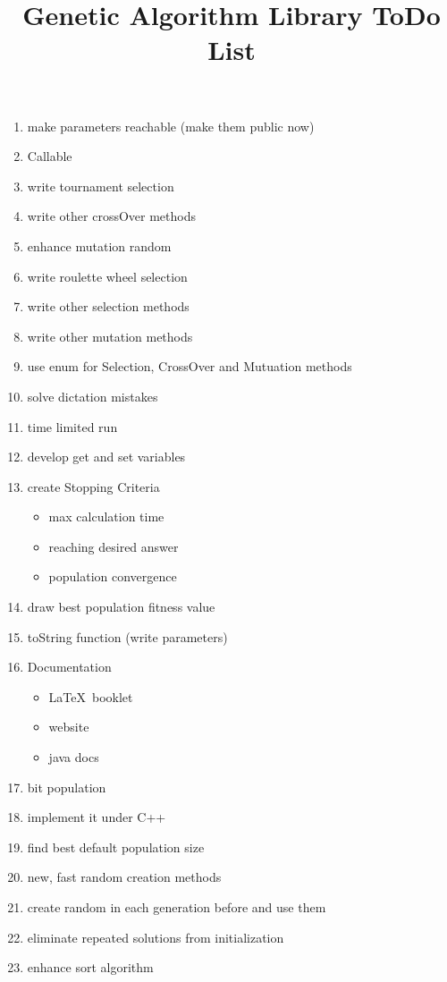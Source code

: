 \documentclass[11]{article}
\title{Genetic Algorithm Library ToDo List}
\begin{document}
\maketitle

\begin{enumerate}
	\item make parameters reachable (make them public now)	
	\item Callable
	\item write tournament selection
	\item write other crossOver methods
	\item enhance mutation random
	\item write roulette wheel selection
	\item write other selection methods
	\item write other mutation methods 
	\item use enum for Selection, CrossOver and Mutuation methods
	\item solve dictation mistakes
	\item time limited run
	\item develop get and set variables
	\item create Stopping Criteria
	\begin{itemize}
		\item max calculation time
		\item reaching desired answer
		\item population convergence
	\end{itemize}
	\item draw best population fitness value
	\item toString function (write parameters)
	\item Documentation
	\begin{itemize}
		\item \LaTeX \ booklet
		\item website
		\item java docs
	\end{itemize}
	\item bit population
	\item implement it under C++	
	\item find best default population size	
	\item new, fast random creation methods
	\item create random in each generation before and use them
	\item eliminate repeated solutions from initialization
	\item enhance sort algorithm

\end{enumerate}
\end{document}
